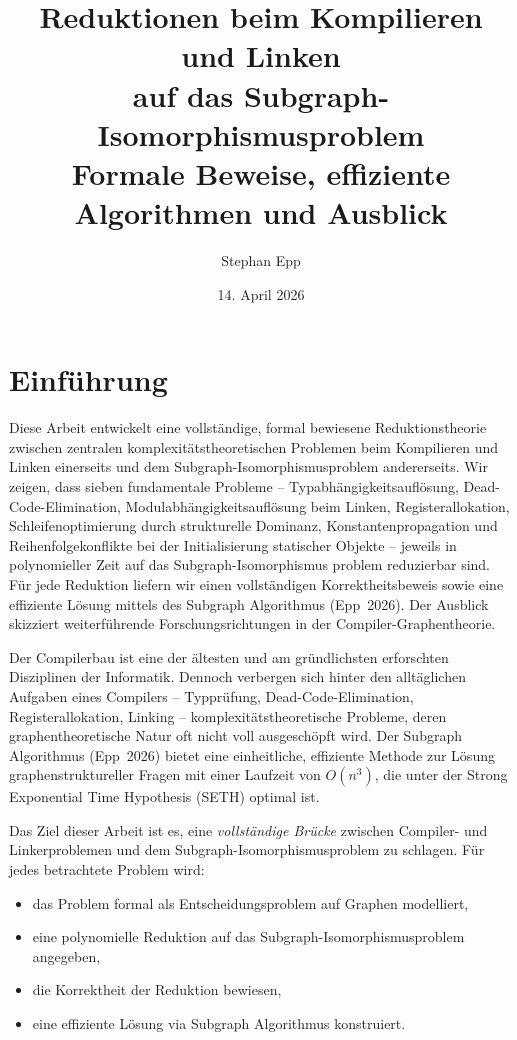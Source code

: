 ﻿\documentclass[a4paper,12pt]{article}
\title{\textbf{Reduktionen beim Kompilieren und Linken\\
auf das Subgraph-Isomorphismusproblem}\\[0.1em]
\large Formale Beweise, effiziente Algorithmen und Ausblick}
\author{Stephan Epp}
\date{14. April 2026}
\theoremstyle{definition}
\begin{document}
\maketitle

\tableofcontents
\newpage

\section{Einführung}
Diese Arbeit entwickelt eine vollständige, formal bewiesene Reduktionstheorie zwischen zentralen komplexitätstheoretischen Problemen beim Kompilieren und Linken einerseits und dem Subgraph-Isomorphismusproblem andererseits. Wir zeigen, dass sieben fundamentale Probleme -- Typabhängigkeitsauflösung, Dead-Code-Elimination, Modulabhängigkeitsauf\-lösung beim Linken, Registerallokation, Schleifenoptimierung durch strukturelle Dominanz, Konstantenpropagation und Reihenfolgekonflikte bei der Initialisierung statischer Objekte -- jeweils in polynomieller Zeit auf das Subgraph-Isomorphismus\- problem reduzierbar sind. Für jede Reduktion liefern wir einen vollständigen Korrektheitsbeweis sowie eine effiziente Lösung mittels des Subgraph Algorithmus (Epp~2026). Der Ausblick skizziert weiterführende Forschungsrichtungen in der Compiler-Graphentheorie.

Der Compilerbau ist eine der ältesten und am gründlichsten erforschten Disziplinen der Informatik. Dennoch verbergen sich hinter den alltäglichen Aufgaben eines Compilers -- Typprüfung, Dead-Code-Elimination, Registerallokation, Linking -- komplexitätstheoretische Probleme, deren graphentheoretische Natur oft nicht voll ausgeschöpft wird. Der Subgraph Algorithmus (Epp~2026) bietet eine einheitliche, effiziente Methode zur Lösung graphenstruktureller Fragen mit einer Laufzeit von $O(n^3)$, die unter der Strong Exponential Time Hypothesis (SETH) optimal ist.

Das Ziel dieser Arbeit ist es, eine \emph{vollständige Brücke} zwischen Compiler- und Linkerproblemen und dem Subgraph-Isomorphismusproblem zu schlagen. Für jedes betrachtete Problem wird:
\begin{itemize}
    \item das Problem formal als Entscheidungsproblem auf Graphen modelliert,
    \item eine polynomielle Reduktion auf das Subgraph-Isomorphismusproblem angegeben,
    \item die Korrektheit der Reduktion bewiesen,
    \item eine effiziente Lösung via Subgraph Algorithmus konstruiert.
\end{itemize}
\end{document}
